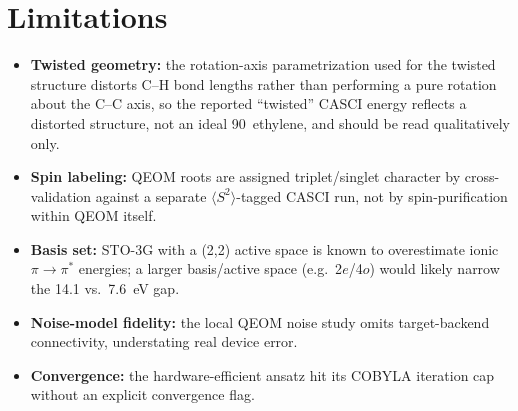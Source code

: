 \documentclass[10pt]{article}
\begin{document}
\section{Limitations}
\label{sec:limitations}
\begin{itemize}
\item \textbf{Twisted geometry:} the rotation-axis parametrization used for
the twisted structure distorts C--H bond lengths rather than performing a
pure rotation about the C--C axis, so the reported ``twisted'' CASCI energy
reflects a distorted structure, not an ideal 90\textdegree\ ethylene, and
should be read qualitatively only.
\item \textbf{Spin labeling:} QEOM roots are assigned triplet/singlet
character by cross-validation against a separate $\langle S^2\rangle$-tagged
CASCI run, not by spin-purification within QEOM itself.
\item \textbf{Basis set:} STO-3G with a (2,2) active space is known to
overestimate ionic $\pi\to\pi^*$ energies; a larger basis/active space
(e.g.\ 2$e$/4$o$) would likely narrow the 14.1 vs.\ 7.6~eV gap.
\item \textbf{Noise-model fidelity:} the local QEOM noise study omits
target-backend connectivity, understating real device error.
\item \textbf{Convergence:} the hardware-efficient ansatz hit its COBYLA
iteration cap without an explicit convergence flag.
\end{itemize}
\end{document}
